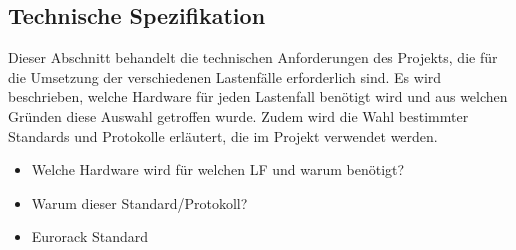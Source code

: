 \newpage
\subsection{Technische Spezifikation}
Dieser Abschnitt behandelt die technischen Anforderungen des Projekts, die für die Umsetzung der verschiedenen Lastenfälle erforderlich sind. Es wird beschrieben, welche Hardware für jeden Lastenfall benötigt wird und aus welchen Gründen diese Auswahl getroffen wurde. Zudem wird die Wahl bestimmter Standards und Protokolle erläutert, die im Projekt verwendet werden.

\begin{itemize}
    \item Welche Hardware wird für welchen LF und warum benötigt?
    \item Warum dieser Standard/Protokoll?
    \item Eurorack Standard
\end{itemize}


